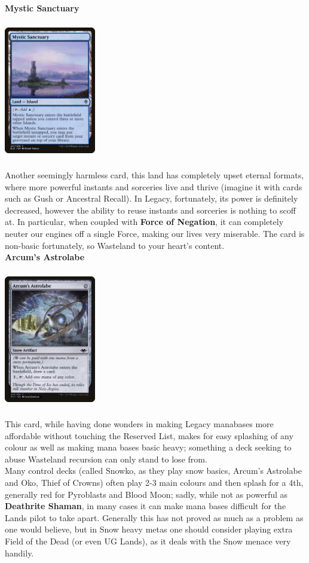 \documentclass{report}
\begin{document}
\newpage
\textbf{Mystic Sanctuary\\}
\begin{center}
\includegraphics [width = 4cm, height = 6cm] {mystic-sanctuary}
\end{center}
Another seemingly harmless card, this land has completely upset eternal formats, where more powerful instants and sorceries live and thrive (imagine it with cards such as Gush or Ancestral Recall). In Legacy, fortunately, its power is definitely decreased, however the ability to reuse instants and sorceries is nothing to scoff at. In particular, when coupled with \textbf{Force of Negation}, it can completely neuter our engines off a single Force, making our lives very miserable. The card is non-basic fortunately, so Wasteland to your heart's content.\\
\textbf{Arcum's Astrolabe\\}
\begin{center}
\includegraphics [width = 4cm, height = 6cm] {arcum-s-astrolabe}
\end{center}
This card, while having done wonders in making Legacy manabases more affordable without touching the Reserved List, makes for easy splashing of any colour as well as making mana bases basic heavy; something a deck seeking to abuse Wasteland recursion can only stand to lose from. \\Many control decks (called Snowko, as they play snow basics, Arcum's Astrolabe and Oko, Thief of Crowns) often play 2-3 main colours and then splash for a 4th, generally red for Pyroblasts and Blood Moon; sadly, while not as powerful as \textbf{Deathrite Shaman}, in many cases it can make mana bases difficult for the Lands pilot to take apart. Generally this has not proved as much as a problem as one would believe, but in Snow heavy metas one should consider playing extra Field of the Dead (or even UG Lands), as it deals with the Snow menace very handily.
\end{document}
